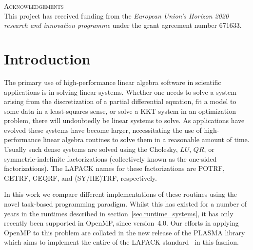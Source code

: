 \documentclass[a4paper,12pt]{article}
\begin{document}
\noindent
\textsc{Acknowledgements}\\[1em]
This project has received funding from the \emph{European Union's Horizon 2020 research and innovation programme} under the grant agreement number 671633.





%

\newpage

\renewcommand{\contentsname}{Table of Contents}
\tableofcontents

\listoffigures

\listoftables





\newpage

%

\section{Introduction}
\label{sec.introduction}
The primary use of high-performance linear algebra software
in scientific applications is in solving linear systems.
Whether one needs to solve a system arising from the discretization of
a partial differential equation,
fit a model to some data in a least-squares sense,
or solve a KKT system in an optimization problem,
there will undoubtedly be linear systems to solve.
As applications have evolved these systems have become larger,
necessitating the use of high-performance linear algebra routines
to solve them in a reasonable amount of time.
Usually such dense systems are solved using
the Cholesky, $LU$, $QR$, or symmetric-indefinite factorizations
(collectively known as the one-sided factorizations).
The LAPACK names for these factorizations are
POTRF, GETRF, GEQRF, and (SY/HE)TRF, respectively.

In this work we compare different implementations of
these routines using the novel task-based programming paradigm.
Whilst this has existed for a number of years in the runtimes
described in section~\ref{sec.runtime_systems},
it has only recently been supported in OpenMP, since version~4.0.
Our efforts in applying OpenMP to this problem
are collated in the new release of the PLASMA library~\cite{addh09}
which aims to implement the entire of the LAPACK standard~\cite{lug99}
in this fashion.
\end{document}

